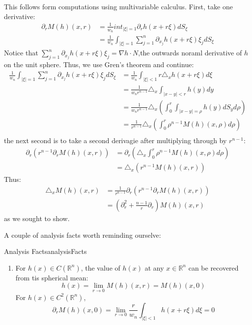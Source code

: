 \documentclass{book}
\newenvironment{Proof}[1][]
  {\begin{ProofTcb}[#1]}
  {\end{ProofTcb}}
\newcommand{\R}{{\mathbb{R}}}
\newcommand{\rw}{\rightarrow}
\begin{document}
\begin{Proof}
	This follows form computations using multivariable calculus. First, take one derivative:
	\begin{align*}
		\partial_r M(h)(x,r) &= \frac{1}{w_n} int_{|\xi| = 1} \partial_r h(x + r\xi)dS_{\xi}\\
							 &= \frac{1}{w_n}\int_{|\xi| = 1} \sum_{j=1}^n  \partial_{x_j}h(x + r\xi)\xi_j dS_{\xi}
	\end{align*}
	Notice that $\sum_{j=1}^n \partial_{x_j}h(x + r\xi)\xi_j = \nabla h\cdot N$,the outwards noraml derivative of $h$ on
	the unit sphere. Thus, we use Gren's theorem and continue:
	\begin{align*}
	 \frac{1}{w_n}\int_{|\xi| = 1} \sum_{j=1}^n  \partial_{x_j}h(x + r\xi)\xi_j dS_{\xi}
	 &= \frac{1}{w_n}\int_{|\xi| < 1} r\triangle_x h(x + r\xi)d\xi\\
	 &= \frac{1}{w_nr^{n-1}} \triangle_x \int_{|x-y| < r} h(y)dy\\
	 &= \frac{1}{w_nr^{n-1}} \triangle_x \left(\int_0^r\int_{|x-y|=\rho} h(y)dS_yd\rho\right)\\
	 &= \frac{1}{r^{n-1}} \triangle_x \left(\int_0^r\rho^{n-1}M(h)(x,\rho)d\rho\right)\\
	\end{align*}
	the next second is to take a second derivagie after multiplying through by $r^{n-1}$:
	\begin{align*}
		\partial_r\left(r^{n-1}  \partial_r M(h)(x,r)\right) &=  \partial_r \left(\triangle_x \int_0^r
		\rho^{n-1}M(h)(x,\rho)d\rho\right)\\
	&= \triangle_x\left(r^{n-1}M(h)(x,r)\right)
	\end{align*}
	Thus:
	\begin{align*}
		\triangle_x M(h)(x,r) &= \frac{1}{r^{n-1}}  \partial_r \left(r^{n-1}  \partial_r M(h)(x,r)\right)\\
		&= \left(  \partial_r^2 + \frac{n-1}{r}  \partial_r\right) M(h)(x,r)
	\end{align*}
	as we sought to show.
\end{Proof}

A couple of analysis facts worth reminding ourselve:

\begin{prop}{Analysis Facts}{analysisFacts}
	\begin{enumerate}
		\item For $h(x) \in C(\R^n)$, the value of $h(x)$ at any $x \in \R^n$ can be recovered from tis spherical mean:
			\[
				h(x) = \lim_{r \rw 0} M(h)(x,r) = M(h)(x,0)
			\]
			For $h(x) \in C^2(\R^n)$,
			\[
				\partial_r M(h)(x,0) = \lim_{r \rw 0} \frac{r}{w_n} \int_{|\xi| < 1} h(x + r\xi)d\xi = 0
			\]
	\end{enumerate}
\end{prop}
\end{document}
